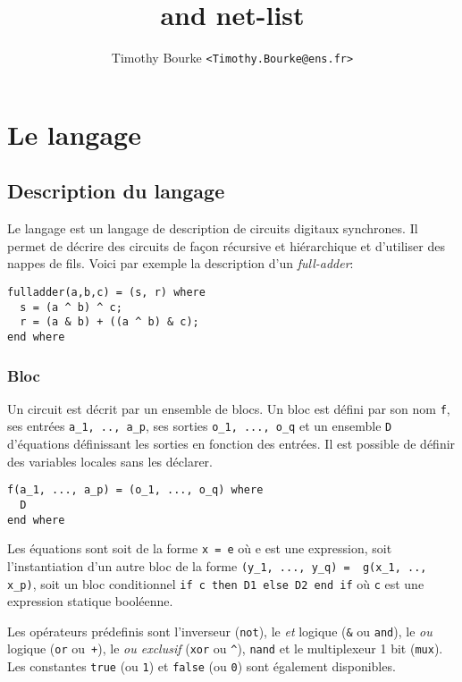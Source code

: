 \documentclass[a4paper]{article}
\title{\minijazz{} and net-list}
\author{Timothy Bourke \texttt{<Timothy.Bourke@ens.fr>}}
\begin{document}
\maketitle

\section{Le langage \minijazz}

\subsection{Description du langage}

Le langage \minijazz{} est un langage de description de circuits digitaux synchrones. Il permet de décrire des circuits de façon récursive et hiérarchique et d'utiliser des nappes de fils. Voici par exemple la description d'un \emph{full-adder}:
\begin{lstlisting}
fulladder(a,b,c) = (s, r) where
  s = (a ^ b) ^ c;
  r = (a & b) + ((a ^ b) & c);
end where
\end{lstlisting}

\subsubsection*{Bloc}

Un circuit est décrit par un ensemble de blocs. Un bloc est défini par son nom \texttt{f}, ses entrées \lstinline{a_1, .., a_p}, ses sorties \lstinline{o_1, ..., o_q} et un ensemble \texttt{D} d'équations définissant les sorties en fonction des entrées. Il est possible de définir des variables locales sans les déclarer.
\begin{lstlisting}
f(a_1, ..., a_p) = (o_1, ..., o_q) where
  D
end where
\end{lstlisting}

Les équations sont soit de la forme \lstinline+x = e+ où e est une expression, soit l'instantiation d'un autre bloc de la forme \lstinline+(y_1, ..., y_q) =  g(x_1, .., x_p)+, soit un bloc conditionnel \lstinline+if c then D1 else D2 end if+ où \lstinline+c+ est une expression statique booléenne.

Les opérateurs prédefinis sont l'inverseur (\lstinline+not+), le \emph{et} 
logique (\lstinline+&+ ou \lstinline+and+), le \emph{ou} logique 
(\lstinline+or+ ou~\lstinline{+}), le \emph{ou exclusif} (\lstinline+xor+ ou 
\lstinline+^+), \lstinline+nand+ et le multiplexeur 1 bit (\lstinline+mux+). 
Les constantes \lstinline+true+ (ou \texttt{1}) et \lstinline+false+ (ou 
\texttt{0}) sont également disponibles.
\end{document}
